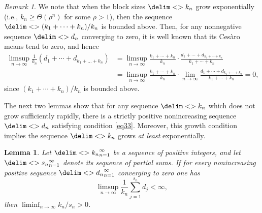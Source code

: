 \documentclass[10pt,reqno]{amsart}
\newtheorem{lemma}[theorem]{Lemma}
\theoremstyle{remark}
\newtheorem{remark}[theorem]{Remark}
\newcommand{\seq}{\delim<>}
\numberwithin{equation}{section}
\begin{document}
\begin{remark}
  \label{rem:exponential-growth-obstruction-disappears}
  We note that when the block sizes $\seq{k_n}$ grow exponentially (i.e., $k_n \ge \Theta(\rho^n)$ for some $\rho > 1$), then the sequence $\seq{(k_1 + \cdots + k_n)/k_n}$ is bounded above.
  Then, for any nonnegative sequence $\seq{d_n}$ converging to zero, it is well known that its Ces\`{a}ro means tend to zero, and hence
  \begin{align*}
    \limsup_{n \to \infty} \frac{1}{k_n}\left(d_1 +  \cdots + d_{k_1+\dots+k_n}\right)
    &= \limsup_{n \to \infty} \frac{k_1 + \cdots + k_n}{k_n} \cdot \frac{d_1 +  \cdots + d_{k_1+\cdots+k_n}}{k_1 + \cdots + k_n} \\
    &= \limsup_{n \to \infty} \frac{k_1 + \cdots + k_n}{k_n} \cdot \lim_{n \to \infty} \frac{d_1 +  \cdots + d_{k_1+\cdots+k_n}}{k_1 + \cdots + k_n} = 0,
  \end{align*}
  since $(k_1 + \cdots + k_n)/k_n$ is bounded above.
\end{remark}

The next two lemmas show that for any sequence $\seq{k_n}$ which does not grow sufficiently rapidly, there is a strictly positive nonincreasing sequence $\seq{d_n}$ satisfying condition \eqref{eq33}.
Moreover, this growth condition implies the sequence $\seq{k_n}$ grows \emph{at least} exponentially.

\begin{lemma}
  \label{lem:exponential-growth-block-size}
  Let $\seq{k_n}_{n=1}^{\infty}$ be a sequence of positive integers, and let $\seq{s_n}_{n=1}^{\infty}$ denote its sequence of partial sums.
  If for every nonincreasing positive sequence $\seq{d_n}_{n=1}^{\infty}$ converging to zero one has
  \begin{equation*}
    \limsup_{n \to \infty} \frac{1}{k_n} \sum_{j=1}^{s_n} d_j < \infty,
  \end{equation*}
  then $\liminf_{n \to \infty} k_n/s_n > 0$.
\end{lemma}
\end{document}
